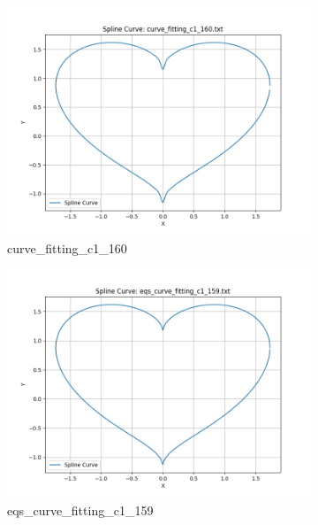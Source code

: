 \documentclass[a4paper]{article}
\begin{document}
\begin{figure}[htbp]
  \begin{subfigure}[t]{0.24\textwidth}
      \centering
      \includegraphics[width=\textwidth]{figures/E/curve_fitting_c1_160.png}
      \caption*{curve\_fitting\_c1\_160}
  \end{subfigure}
  \begin{subfigure}[t]{0.24\textwidth}
      \centering
      \includegraphics[width=\textwidth]{figures/E/eqs_curve_fitting_c1_159.png}
      \caption*{eqs\_curve\_fitting\_c1\_159}
  \end{subfigure}
  \begin{subfigure}[t]{0.24\textwidth}
      \centering

\end{subfigure}
\end{figure}
\end{document}
